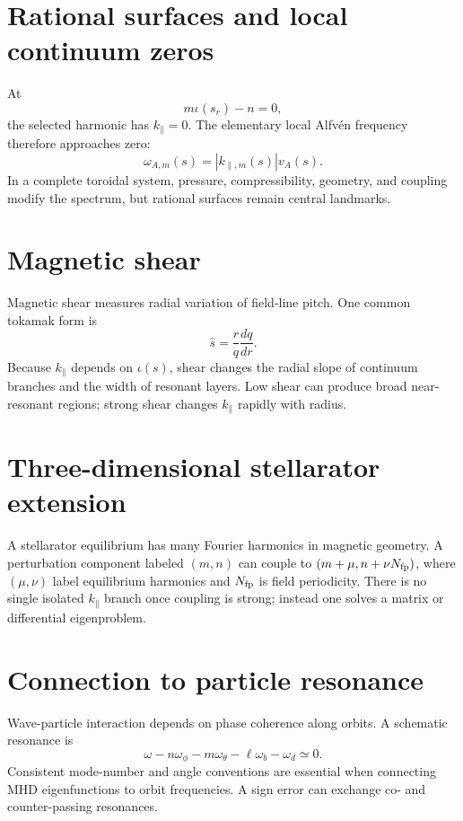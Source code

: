 \documentclass[11pt]{article}
\begin{document}
\section{Rational surfaces and local continuum zeros}

At
\begin{equation}
m\iota(s_r)-n=0,
\end{equation}
the selected harmonic has $k_\parallel=0$. The elementary local Alfvén frequency therefore approaches zero:
\begin{equation}
\omega_{A,m}(s)=|k_{\parallel,m}(s)|v_A(s).
\end{equation}
In a complete toroidal system, pressure, compressibility, geometry, and coupling modify the spectrum, but rational surfaces remain central landmarks.


\section{Magnetic shear}

Magnetic shear measures radial variation of field-line pitch. One common tokamak form is
\begin{equation}
\hat s=\frac{r}{q}\frac{dq}{dr}.
\end{equation}
Because $k_\parallel$ depends on $\iota(s)$, shear changes the radial slope of continuum branches and the width of resonant layers. Low shear can produce broad near-resonant regions; strong shear changes $k_\parallel$ rapidly with radius.


\section{Three-dimensional stellarator extension}

A stellarator equilibrium has many Fourier harmonics in magnetic geometry. A perturbation component labeled $(m,n)$ can couple to $(m+\mu,n+\nu N_{\rm fp})$, where $(\mu,\nu)$ label equilibrium harmonics and $N_{\rm fp}$ is field periodicity. There is no single isolated $k_\parallel$ branch once coupling is strong; instead one solves a matrix or differential eigenproblem.


\section{Connection to particle resonance}

Wave-particle interaction depends on phase coherence along orbits. A schematic resonance is
\begin{equation}
\omega-n\omega_\phi-m\omega_\theta-\ell\omega_b-\omega_d\simeq0.
\end{equation}
Consistent mode-number and angle conventions are essential when connecting MHD eigenfunctions to orbit frequencies. A sign error can exchange co- and counter-passing resonances.
\end{document}
